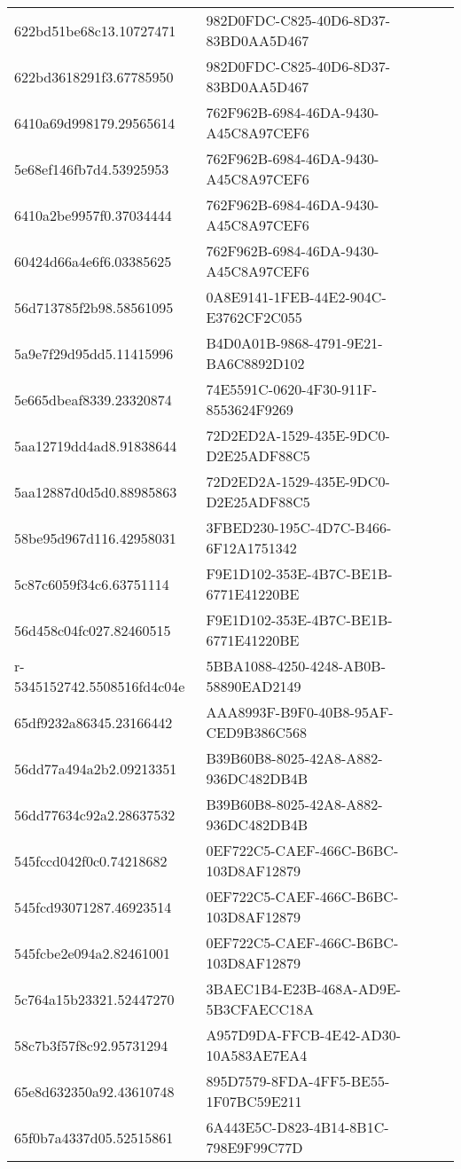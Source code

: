 \begin{tabular}{ll}
622bd51be68c13.10727471 & 982D0FDC-C825-40D6-8D37-83BD0AA5D467 \\
622bd3618291f3.67785950 & 982D0FDC-C825-40D6-8D37-83BD0AA5D467 \\
6410a69d998179.29565614 & 762F962B-6984-46DA-9430-A45C8A97CEF6 \\
5e68ef146fb7d4.53925953 & 762F962B-6984-46DA-9430-A45C8A97CEF6 \\
6410a2be9957f0.37034444 & 762F962B-6984-46DA-9430-A45C8A97CEF6 \\
60424d66a4e6f6.03385625 & 762F962B-6984-46DA-9430-A45C8A97CEF6 \\
56d713785f2b98.58561095 & 0A8E9141-1FEB-44E2-904C-E3762CF2C055 \\
5a9e7f29d95dd5.11415996 & B4D0A01B-9868-4791-9E21-BA6C8892D102 \\
5e665dbeaf8339.23320874 & 74E5591C-0620-4F30-911F-8553624F9269 \\
5aa12719dd4ad8.91838644 & 72D2ED2A-1529-435E-9DC0-D2E25ADF88C5 \\
5aa12887d0d5d0.88985863 & 72D2ED2A-1529-435E-9DC0-D2E25ADF88C5 \\
58be95d967d116.42958031 & 3FBED230-195C-4D7C-B466-6F12A1751342 \\
5c87c6059f34c6.63751114 & F9E1D102-353E-4B7C-BE1B-6771E41220BE \\
56d458c04fc027.82460515 & F9E1D102-353E-4B7C-BE1B-6771E41220BE \\
r-5345152742.5508516fd4c04e & 5BBA1088-4250-4248-AB0B-58890EAD2149 \\
65df9232a86345.23166442 & AAA8993F-B9F0-40B8-95AF-CED9B386C568 \\
56dd77a494a2b2.09213351 & B39B60B8-8025-42A8-A882-936DC482DB4B \\
56dd77634c92a2.28637532 & B39B60B8-8025-42A8-A882-936DC482DB4B \\
545fccd042f0c0.74218682 & 0EF722C5-CAEF-466C-B6BC-103D8AF12879 \\
545fcd93071287.46923514 & 0EF722C5-CAEF-466C-B6BC-103D8AF12879 \\
545fcbe2e094a2.82461001 & 0EF722C5-CAEF-466C-B6BC-103D8AF12879 \\
5c764a15b23321.52447270 & 3BAEC1B4-E23B-468A-AD9E-5B3CFAECC18A \\
58c7b3f57f8c92.95731294 & A957D9DA-FFCB-4E42-AD30-10A583AE7EA4 \\
65e8d632350a92.43610748 & 895D7579-8FDA-4FF5-BE55-1F07BC59E211 \\
65f0b7a4337d05.52515861 & 6A443E5C-D823-4B14-8B1C-798E9F99C77D \\

\end{tabular}
